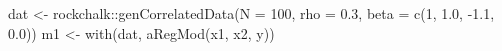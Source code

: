 \begin{Schunk}
\begin{Sinput}
 dat <- rockchalk::genCorrelatedData(N = 100, rho = 0.3, beta = c(1, 1.0, -1.1, 0.0))
 m1 <- with(dat, aRegMod(x1, x2, y))
\end{Sinput}
\end{Schunk}
